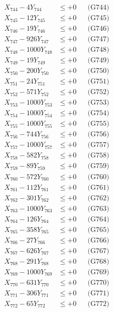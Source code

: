 \documentclass[a4paper,10pt]{article}
\begin{document}
{\begin{align}
X_{744} - 4Y_{744} &\leq +0 && \text{(G744)} \\
X_{745} - 12Y_{745} &\leq +0 && \text{(G745)} \\
X_{746} - 19Y_{746} &\leq +0 && \text{(G746)} \\
X_{747} - 926Y_{747} &\leq +0 && \text{(G747)} \\
X_{748} - 1000Y_{748} &\leq +0 && \text{(G748)} \\
X_{749} - 19Y_{749} &\leq +0 && \text{(G749)} \\
X_{750} - 200Y_{750} &\leq +0 && \text{(G750)} \\
\allowbreak
X_{751} - 24Y_{751} &\leq +0 && \text{(G751)} \\
X_{752} - 571Y_{752} &\leq +0 && \text{(G752)} \\
X_{753} - 1000Y_{753} &\leq +0 && \text{(G753)} \\
X_{754} - 1000Y_{754} &\leq +0 && \text{(G754)} \\
X_{755} - 1000Y_{755} &\leq +0 && \text{(G755)} \\
X_{756} - 744Y_{756} &\leq +0 && \text{(G756)} \\
X_{757} - 1000Y_{757} &\leq +0 && \text{(G757)} \\
X_{758} - 582Y_{758} &\leq +0 && \text{(G758)} \\
X_{759} - 89Y_{759} &\leq +0 && \text{(G759)} \\
X_{760} - 572Y_{760} &\leq +0 && \text{(G760)} \\
\allowbreak
X_{761} - 112Y_{761} &\leq +0 && \text{(G761)} \\
X_{762} - 301Y_{762} &\leq +0 && \text{(G762)} \\
X_{763} - 1000Y_{763} &\leq +0 && \text{(G763)} \\
X_{764} - 126Y_{764} &\leq +0 && \text{(G764)} \\
X_{765} - 358Y_{765} &\leq +0 && \text{(G765)} \\
X_{766} - 27Y_{766} &\leq +0 && \text{(G766)} \\
X_{767} - 626Y_{767} &\leq +0 && \text{(G767)} \\
X_{768} - 291Y_{768} &\leq +0 && \text{(G768)} \\
X_{769} - 1000Y_{769} &\leq +0 && \text{(G769)} \\
X_{770} - 631Y_{770} &\leq +0 && \text{(G770)} \\
\allowbreak
X_{771} - 306Y_{771} &\leq +0 && \text{(G771)} \\
X_{772} - 65Y_{772} &\leq +0 && \text{(G772)} \\

\end{align}}
\end{document}
